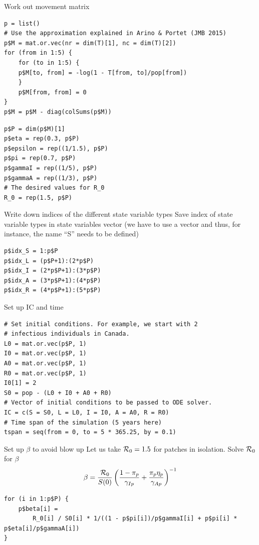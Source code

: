 \documentclass[aspectratio=43]{beamer}
\begin{document}
\begin{frame}[fragile]{Work out movement matrix}
\begin{lstlisting}
p = list()
# Use the approximation explained in Arino & Portet (JMB 2015)
p$M = mat.or.vec(nr = dim(T)[1], nc = dim(T)[2])
for (from in 1:5) {
	for (to in 1:5) {
	p$M[to, from] = -log(1 - T[from, to]/pop[from])
	}
	p$M[from, from] = 0
}
p$M = p$M - diag(colSums(p$M))
\end{lstlisting}	
\end{frame}

\begin{frame}[fragile]
\begin{lstlisting}
p$P = dim(p$M)[1]
p$eta = rep(0.3, p$P)
p$epsilon = rep((1/1.5), p$P)
p$pi = rep(0.7, p$P)
p$gammaI = rep((1/5), p$P)
p$gammaA = rep((1/3), p$P)
# The desired values for R_0
R_0 = rep(1.5, p$P)
\end{lstlisting}	
\end{frame}

\begin{frame}[fragile]{Write down indices of the different state variable types}
	Save index of state variable types in state variables vector (we have to use a vector and thus, for instance, the name ``S'' needs to be defined)
\begin{lstlisting}
p$idx_S = 1:p$P
p$idx_L = (p$P+1):(2*p$P)
p$idx_I = (2*p$P+1):(3*p$P)
p$idx_A = (3*p$P+1):(4*p$P)
p$idx_R = (4*p$P+1):(5*p$P)
\end{lstlisting}	
\end{frame}

\begin{frame}[fragile]{Set up IC and time}
\begin{lstlisting}
# Set initial conditions. For example, we start with 2
# infectious individuals in Canada.
L0 = mat.or.vec(p$P, 1)
I0 = mat.or.vec(p$P, 1)
A0 = mat.or.vec(p$P, 1)
R0 = mat.or.vec(p$P, 1)
I0[1] = 2
S0 = pop - (L0 + I0 + A0 + R0)
# Vector of initial conditions to be passed to ODE solver.
IC = c(S = S0, L = L0, I = I0, A = A0, R = R0)
# Time span of the simulation (5 years here)
tspan = seq(from = 0, to = 5 * 365.25, by = 0.1)
\end{lstlisting}	
\end{frame}


\begin{frame}[fragile]{Set up $\beta$ to avoid blow up}
	Let us take $\mathcal{R}_0=1.5$ for patches in isolation. Solve $\mathcal{R}_0$ for $\beta$ 
	$$
	\beta=\frac{\mathcal{R}_0}{S(0)}
	\left(
	\frac{1-\pi_p}{\gamma_{Ip}}
	+\frac{\pi_p\eta_p}{\gamma_{Ap}}
	\right)^{-1}
	$$ 
\begin{lstlisting}
for (i in 1:p$P) {
	p$beta[i] = 
		R_0[i] / S0[i] * 1/((1 - p$pi[i])/p$gammaI[i] + p$pi[i] * p$eta[i]/p$gammaA[i])
}
\end{lstlisting}	
\end{frame}
\end{document}
